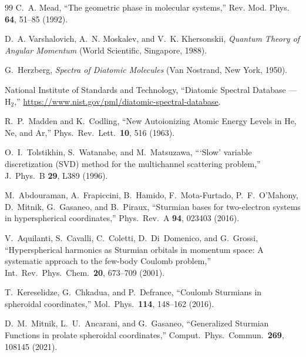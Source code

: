\documentclass[aps,pra,twocolumn,superscriptaddress,longbibliography]{revtex4-2}
\begin{document}
\begin{thebibliography}{99}
C.~A. Mead,
``The geometric phase in molecular systems,''
Rev. Mod. Phys. \textbf{64}, 51--85 (1992).

D.~A. Varshalovich, A.~N. Moskalev, and V.~K. Khersonskii,
\textit{Quantum Theory of Angular Momentum}
(World Scientific, Singapore, 1988).

G.~Herzberg,
\textit{Spectra of Diatomic Molecules}
(Van Nostrand, New York, 1950).

National Institute of Standards and Technology,
``Diatomic Spectral Database --- H$_2$,''
\url{https://www.nist.gov/pml/diatomic-spectral-database}.

R.~P.~Madden and K.~Codling,
``New Autoionizing Atomic Energy Levels in He, Ne, and Ar,''
Phys.\ Rev.\ Lett.\ \textbf{10}, 516 (1963).

O.~I.~Tolstikhin, S.~Watanabe, and M.~Matsuzawa,
```Slow' variable discretization (SVD) method for the multichannel
scattering problem,''
J.\ Phys.\ B \textbf{29}, L389 (1996).

M.~Abdouraman, A.~Frapiccini, B.~Hamido, F.~Mota-Furtado,
P.~F.~O'Mahony, D.~Mitnik, G.~Gasaneo, and B.~Piraux,
``Sturmian bases for two-electron systems in hyperspherical
coordinates,''
Phys.\ Rev.\ A \textbf{94}, 023403 (2016).

V.~Aquilanti, S.~Cavalli, C.~Coletti, D.~Di~Domenico, and G.~Grossi,
``Hyperspherical harmonics as Sturmian orbitals in momentum space:
A systematic approach to the few-body Coulomb problem,''
Int.\ Rev.\ Phys.\ Chem.\ \textbf{20}, 673--709 (2001).

T.~Kereselidze, G.~Chkadua, and P.~Defrance,
``Coulomb Sturmians in spheroidal coordinates,''
Mol.\ Phys.\ \textbf{114}, 148--162 (2016).

D.~M.~Mitnik, L.~U.~Ancarani, and G.~Gasaneo,
``Generalized Sturmian Functions in prolate spheroidal coordinates,''
Comput.\ Phys.\ Commun.\ \textbf{269}, 108145 (2021).

\end{thebibliography}
\end{document}
